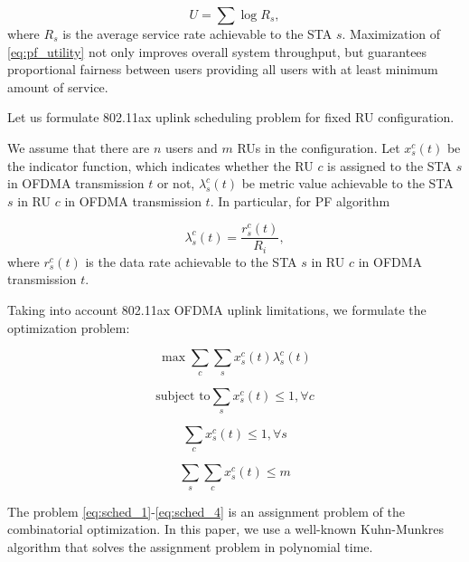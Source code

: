\documentclass[conference]{IEEEtran}
\begin{document}
\begin{equation}
U = \sum\limits \log R_s, \label{eq:pf_utility}
\end{equation}
where $R_s$ is the average service rate achievable to the STA $s$. Maximization  of \eqref{eq:pf_utility} not only improves  overall system throughput, but guarantees proportional fairness between users providing all users with at least minimum amount of service.

Let us formulate 802.11ax uplink scheduling problem for fixed RU configuration. 

We assume that there are $n$ users and $m$ RUs in the configuration. Let $x_s^c(t)$ be the indicator function, which indicates whether the RU $c$ is assigned to the STA $s$ in  OFDMA transmission $t$ or not, $\lambda_s^c(t)$ be metric value achievable to the STA $s$ in RU $c$ in OFDMA transmission $t$. In particular, for PF algorithm 

\begin{equation}
\lambda_s^c(t) = \frac{r_s^c(t)}{R_i},
\end{equation}
where $r_s^c(t)$ is the data rate achievable to the STA $s$ in RU $c$ in OFDMA transmission $t$.

Taking into account 802.11ax OFDMA uplink limitations, we formulate the optimization problem:


\begin{equation}
\max \sum\limits_c \sum\limits_s x_s^c(t) \lambda_s^c(t) \label{eq:sched_1}
\end{equation}

\begin{equation}
\mbox{subject to}\sum\limits_s x_s^c(t) \leq 1, \forall c \label{eq:sched_2}
\end{equation}

\begin{equation}
\sum\limits_c x_s^c(t) \leq 1, \forall s \label{eq:sched_3}
\end{equation}

\begin{equation}
\sum\limits_s \sum\limits_c x_s^c(t) \leq m \label{eq:sched_4}
\end{equation}

The problem \eqref{eq:sched_1}-\eqref{eq:sched_4} is an assignment problem of the combinatorial optimization. In this paper, we use a well-known Kuhn-Munkres algorithm\cite{bourgeois1971extension} that solves the assignment problem in polynomial time.

\end{document}

